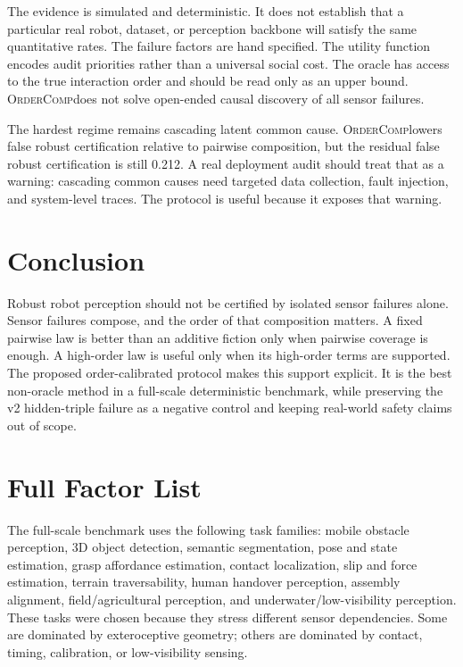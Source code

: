 \documentclass{article}
\newcommand{\method}{\textsc{OrderComp}}
\begin{document}
The evidence is simulated and deterministic. It does not establish that a particular real robot, dataset, or perception backbone will satisfy the same quantitative rates. The failure factors are hand specified. The utility function encodes audit priorities rather than a universal social cost. The oracle has access to the true interaction order and should be read only as an upper bound. \method does not solve open-ended causal discovery of all sensor failures.

The hardest regime remains cascading latent common cause. \method lowers false robust certification relative to pairwise composition, but the residual false robust certification is still 0.212. A real deployment audit should treat that as a warning: cascading common causes need targeted data collection, fault injection, and system-level traces. The protocol is useful because it exposes that warning.

\section{Conclusion}

Robust robot perception should not be certified by isolated sensor failures alone. Sensor failures compose, and the order of that composition matters. A fixed pairwise law is better than an additive fiction only when pairwise coverage is enough. A high-order law is useful only when its high-order terms are supported. The proposed order-calibrated protocol makes this support explicit. It is the best non-oracle method in a full-scale deterministic benchmark, while preserving the v2 hidden-triple failure as a negative control and keeping real-world safety claims out of scope.

\appendix
\renewcommand{\thesection}{\arabic{section}}

\section{Full Factor List}

The full-scale benchmark uses the following task families: mobile obstacle perception, 3D object detection, semantic segmentation, pose and state estimation, grasp affordance estimation, contact localization, slip and force estimation, terrain traversability, human handover perception, assembly alignment, field/agricultural perception, and underwater/low-visibility perception. These tasks were chosen because they stress different sensor dependencies. Some are dominated by exteroceptive geometry; others are dominated by contact, timing, calibration, or low-visibility sensing.
\end{document}

